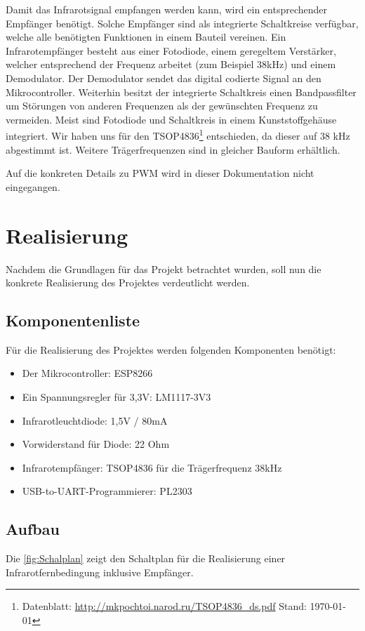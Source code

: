 Damit das Infrarotsignal empfangen werden kann, wird ein entsprechender Empfänger benötigt.
Solche Empfänger sind als integrierte Schaltkreise verfügbar, welche alle benötigten Funktionen in einem Bauteil vereinen.
Ein Infrarotempfänger besteht aus einer Fotodiode, einem geregeltem Verstärker, welcher entsprechend der Frequenz arbeitet (zum Beispiel 38kHz) und einem Demodulator.
Der Demodulator sendet das digital codierte Signal an den Mikrocontroller.
Weiterhin besitzt der integrierte Schaltkreis einen Bandpassfilter um Störungen von anderen Frequenzen als der gewünschten Frequenz zu vermeiden.
Meist sind Fotodiode und Schaltkreis in einem Kunststoffgehäuse integriert.
Wir haben uns für den TSOP4836\footnote{Datenblatt: \url{http://mkpochtoi.narod.ru/TSOP4836_ds.pdf} Stand: \today} entschieden, da dieser auf 38 kHz abgestimmt ist. Weitere Trägerfrequenzen sind in gleicher Bauform erhältlich.

Auf die konkreten Details zu \acs{PWM} wird in dieser Dokumentation nicht eingegangen.

\section{Realisierung}
Nachdem die Grundlagen für das Projekt betrachtet wurden, soll nun die konkrete Realisierung des Projektes verdeutlicht werden.
\subsection{Komponentenliste}
Für die Realisierung des Projektes werden folgenden Komponenten benötigt:
\begin{itemize}
	\item Der Mikrocontroller: ESP8266
	\item Ein Spannungsregler für 3,3V: LM1117-3V3
	\item Infrarotleuchtdiode: 1,5V / 80mA
	\item Vorwiderstand für Diode: 22 Ohm
	\item Infrarotempfänger: TSOP4836 für die Trägerfrequenz 38kHz
	\item USB-to-UART-Programmierer: PL2303
\end{itemize}


\subsection{Aufbau}
Die \autoref{fig:Schalplan} zeigt den Schaltplan für die Realisierung einer Infrarotfernbedingung inklusive Empfänger.

